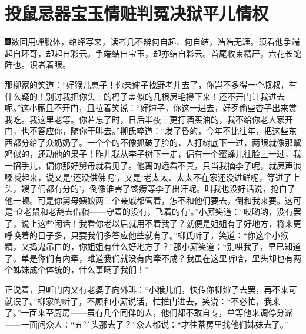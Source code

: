

\chapter{投鼠忌器宝玉情赃\hspace{.5em}判冤决狱平儿情权}

{\includegraphics[width=3mm]{../Images/00005}数回用蝉脱体，络绎写来，读者几不辨何自起、何自结，浩浩无涯。须看他争端起自环哥，却起自彩云。争端结自宝玉，却亦结自彩云。首尾收束精严，六花长蛇阵也。识者着眼。}

那柳家的笑道：``好猴儿崽子！你亲婶子找野老儿去了，你岂不多得一个叔叔，有什么疑的！别讨我把你头上的杩子盖似的几根屄毛撏下来！还不开门让我进去呢。''这小厮且不开门，且拉着笑说：``好婶子，你这一进去，好歹偷些杏子出来赏我吃。我这里老等。你若忘了时，日后半夜三更打酒买油的，我不给你老人家开门，也不答应你，随你干叫去。''柳氏啐道：``发了昏的，今年不比往年，把这些东西都分给了众奶奶了。一个个的不像抓破了脸的，人打树底下一过，两眼就像那黧鸡似的，还动他的果子！昨儿我从李子树下一走，偏有一个蜜蜂儿往脸上一过，我一招手儿，偏你那好舅母就看见了。他离的远看不真，只当我摘李子呢，就屄声浪嗓喊起来，说又是`还没供佛呢'，又是`老太太、太太不在家还没进鲜呢，等进了上头，嫂子们都有分的'，倒像谁害了馋痨等李子出汗呢。叫我也没好话说，抢白了他一顿。可是你舅母姨娘两三个亲戚都管着，怎不和他们要去，倒和我来要。这可是`仓老鼠和老鸹去借粮------守着的没有，飞着的有'。''小厮笑道：``哎哟哟，没有罢了，说上这些闲话！我看你老以后就用不着我了？就便是姐姐有了好地方，将来更呼唤着的日子多，只要我们多答应他些就有了。''柳氏听了，笑道：``你这个小猴精，又捣鬼吊白的，你姐姐有什么好地方了？''那小厮笑道：``别哄我了，早已知道了。单是你们有内牵，难道我们就没有内牵不成？我虽在这里听哈，里头却也有两个姊妹成个体统的，什么事瞒了我们！''

正说着，只听门内又有老婆子向外叫：``小猴儿们，快传你柳婶子去罢，再不来可就误了。''柳家的听了，不顾和小厮说话，忙推门进去，笑说：``不必忙，我来了。''一面来至厨房------虽有几个同伴的人，他们都不敢自专，单等他来调停分派------一面问众人：``五丫头那去了？''众人都说：``才往茶房里找他们姊妹去了。''

